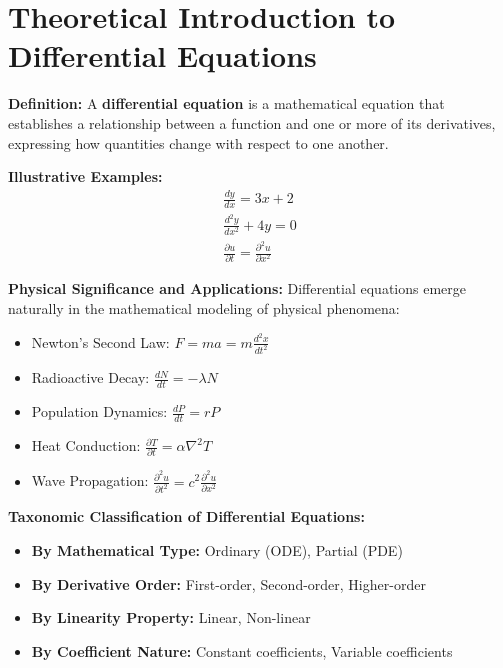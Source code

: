 \documentclass[12pt, letterpaper]{book}
\theoremstyle{problemstyle}
\theoremstyle{solutionstyle}
\begin{document}
\section{Theoretical Introduction to Differential Equations}
\textbf{Definition:}
A \textbf{differential equation} is a mathematical equation that establishes a relationship between a function and one or more of its derivatives, expressing how quantities change with respect to one another.

\textbf{Illustrative Examples:}
\begin{align*}
    \frac{dy}{dx} = 3x + 2 \\  %
    \frac{d^2y}{dx^2} + 4y = 0 \\  %
    \frac{\partial u}{\partial t} = \frac{\partial^2 u}{\partial x^2}  %
\end{align*}

\textbf{Physical Significance and Applications:}
Differential equations emerge naturally in the mathematical modeling of physical phenomena:
\begin{itemize}
    \item Newton's Second Law: $F = ma = m\frac{d^2x}{dt^2}$
    \item Radioactive Decay: $\frac{dN}{dt} = -\lambda N$
    \item Population Dynamics: $\frac{dP}{dt} = rP$
    \item Heat Conduction: $\frac{\partial T}{\partial t} = \alpha \nabla^2 T$
    \item Wave Propagation: $\frac{\partial^2 u}{\partial t^2} = c^2 \frac{\partial^2 u}{\partial x^2}$
\end{itemize}

\textbf{Taxonomic Classification of Differential Equations:}
\begin{itemize}
    \item \textbf{By Mathematical Type:} Ordinary (ODE), Partial (PDE)
    \item \textbf{By Derivative Order:} First-order, Second-order, Higher-order
    \item \textbf{By Linearity Property:} Linear, Non-linear
    \item \textbf{By Coefficient Nature:} Constant coefficients, Variable coefficients
\end{itemize}
\end{document}
